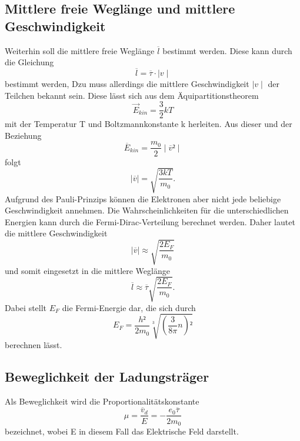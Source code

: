 \subsection{Mittlere freie Weglänge und mittlere Geschwindigkeit}
    Weiterhin soll die mittlere freie Weglänge $\overline l$ bestimmt werden. Diese 
    kann durch die Gleichung
    \begin{equation}
        \label{eqn: Weglaenge}
        \overline l = \overline \tau \cdot \mid v \mid
    \end{equation}
    bestimmt werden, Dzu muss allerdings die mittlere Geschwindigkeit $\mid v \mid$ der Teilchen
    bekannt sein. Diese lässt sich aus dem Äquipartitionstheorem 
    \begin{equation}
        \vec E_{kin}=\dfrac{3}{2} k T
    \end{equation}
    mit der Temperatur T und Boltzmannkonstante k herleiten. Aus dieser und der Beziehung
    \begin{equation*}
        \overline E_{kin} = \dfrac{m_0}{2}\mid \overline v² \mid
    \end{equation*}
    folgt
    \begin{equation}
        \mid \overline v \mid = \sqrt{\dfrac{3kT}{m_0}}.
    \end{equation}
    Aufgrund des Pauli-Prinzips können die Elektronen aber nicht jede beliebige Geschwindigkeit 
    annehmen. Die Wahrscheinlichkeiten für die unterschiedlichen Energien kann durch die
    Fermi-Dirac-Verteilung berechnet werden. Daher lautet die mittlere Geschwindigkeit
    \begin{equation}
        \mid \overline v \mid \approx \sqrt{\dfrac{2 E_F}{m_0}}
    \end{equation}
    und somit eingesetzt in \label{eqn: Weglaenge} die mittlere Weglänge
    \begin{equation}
        \overline l \approx \overline \tau \sqrt{\dfrac{2 E_F}{m_0}}.
    \end{equation}
    Dabei stellt $E_F$ die Fermi-Energie dar, die sich durch
    \begin{equation}
        E_F = \dfrac{h²}{2 m_0}\sqrt[3]{(\dfrac{3}{8\pi }n)²}
    \end{equation}
    berechnen lässt.
\subsection{Beweglichkeit der Ladungsträger}
    Als Beweglichkeit wird die Proportionalitätskonstante 
    \begin{equation}
        \mu = \dfrac{\overline v_d}{E} = - \dfrac{e_0 \overline \tau}{2 m_0}
    \end{equation}
    bezeichnet, wobei E in diesem Fall das Elektrische Feld darstellt.
